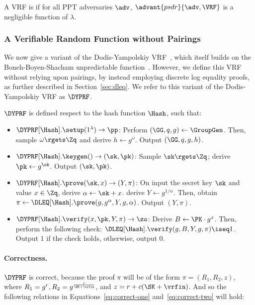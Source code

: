 \begin{definition}
  A VRF is  if for all PPT adversaries $\adv$,
  $\advant{psdr}{\adv,\VRF}$ is a negligible function of $\lambda$.
\end{definition}


\subsubsection{A Verifiable Random Function without Pairings}
\label{sec:dyprf}

We now give a variant of the Dodis-Yampolskiy VRF~\cite{DodisY05},
which itself builds on the Boneh-Boyen-Shacham unpredictable function~\cite{BonehBS04}.
However, we define this VRF without relying upon pairings,
by instead employing discrete log equality proofs,
as further described in Section~\ref{sec:dleq}.
We refer to this variant of the Dodis-Yampolskiy VRF as $\DYPRF$.

$\DYPRF$ is defined respect to the hash function $\Hash$,
such that:

  \begin{itemize}
    \item $\DYPRF[\Hash].\setup(1^\lambda) \rightarrow \pp$:
      Perform $(\GG, q, g) \gets \GroupGen$.
      Then, sample $\omega \rgets \Zq$ and derive $h \gets g^\omega$.
      Output $(\GG, q, g, h) $.
    \item $\DYPRF[\Hash].\keygen() \rightarrow (\sk, \pk)$:
        Sample $\sk \rgets \Zq$; derive $\pk \gets g^{\sk}$.
        Output $(\sk, \pk)$.
      \item $\DYPRF[\Hash].\prove(\sk, x) \rightarrow (Y, \pi)$:
        On input the secret key $\sk$ and value $x \in \Zq$,
        derive $\alpha \gets \sk + x$.
        derive $ Y \gets g^{1/\alpha}$.
        Then, obtain $\pi \gets \DLEQ[\Hash].\prove(g, g^\alpha, Y, g, \alpha)$.
        Output $(Y, \pi)$.
      \item $\DYPRF[\Hash].\verify(x, \pk, Y, \pi) \rightarrow \zo$:
        Derive $B \gets \PK \cdot g^x$.
        Then, perform the following check: $\DLEQ[\Hash].\verify(g, B, Y, g, \pi) \iseq 1$.
        Output $1$ if the check holds, otherwise, output $0$.
  \end{itemize}

\paragraph{Correctness.}
$\DYPRF$ is correct, because the proof $\pi$ will be of the form $\pi = (R_1, R_2, z)$,
where $R_1 = g^r, R_2 = g^{\frac{r}{\SK + \vrfin}}$,
and $z = r + c(\SK + \vrfin)$.
And so the following relations in Equations~\ref{eq:correct-one} and~\ref{eq:correct-two} will hold:

